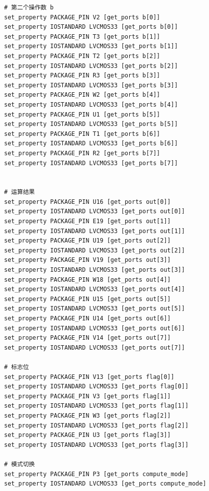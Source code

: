 \documentclass{SYSUReport}
\begin{document}
\begin{enumerate}[label={\chinese*、},labelsep=0pt]
\begin{enumerate}[label = \arabic*、]
\begin{verbatim}
        # 第二个操作数 b
        set_property PACKAGE_PIN V2 [get_ports b[0]]
        set_property IOSTANDARD LVCMOS33 [get_ports b[0]]
        set_property PACKAGE_PIN T3 [get_ports b[1]]
        set_property IOSTANDARD LVCMOS33 [get_ports b[1]]
        set_property PACKAGE_PIN T2 [get_ports b[2]]
        set_property IOSTANDARD LVCMOS33 [get_ports b[2]]
        set_property PACKAGE_PIN R3 [get_ports b[3]]
        set_property IOSTANDARD LVCMOS33 [get_ports b[3]]
        set_property PACKAGE_PIN W2 [get_ports b[4]]
        set_property IOSTANDARD LVCMOS33 [get_ports b[4]]
        set_property PACKAGE_PIN U1 [get_ports b[5]]
        set_property IOSTANDARD LVCMOS33 [get_ports b[5]]
        set_property PACKAGE_PIN T1 [get_ports b[6]]
        set_property IOSTANDARD LVCMOS33 [get_ports b[6]]
        set_property PACKAGE_PIN R2 [get_ports b[7]]
        set_property IOSTANDARD LVCMOS33 [get_ports b[7]]


        # 运算结果
        set_property PACKAGE_PIN U16 [get_ports out[0]]
        set_property IOSTANDARD LVCMOS33 [get_ports out[0]]
        set_property PACKAGE_PIN E19 [get_ports out[1]]
        set_property IOSTANDARD LVCMOS33 [get_ports out[1]]
        set_property PACKAGE_PIN U19 [get_ports out[2]]
        set_property IOSTANDARD LVCMOS33 [get_ports out[2]]
        set_property PACKAGE_PIN V19 [get_ports out[3]]
        set_property IOSTANDARD LVCMOS33 [get_ports out[3]]
        set_property PACKAGE_PIN W18 [get_ports out[4]]
        set_property IOSTANDARD LVCMOS33 [get_ports out[4]]
        set_property PACKAGE_PIN U15 [get_ports out[5]]
        set_property IOSTANDARD LVCMOS33 [get_ports out[5]]
        set_property PACKAGE_PIN U14 [get_ports out[6]]
        set_property IOSTANDARD LVCMOS33 [get_ports out[6]]
        set_property PACKAGE_PIN V14 [get_ports out[7]]
        set_property IOSTANDARD LVCMOS33 [get_ports out[7]]

        # 标志位
        set_property PACKAGE_PIN V13 [get_ports flag[0]]
        set_property IOSTANDARD LVCMOS33 [get_ports flag[0]]
        set_property PACKAGE_PIN V3 [get_ports flag[1]]
        set_property IOSTANDARD LVCMOS33 [get_ports flag[1]]
        set_property PACKAGE_PIN W3 [get_ports flag[2]]
        set_property IOSTANDARD LVCMOS33 [get_ports flag[2]]
        set_property PACKAGE_PIN U3 [get_ports flag[3]]
        set_property IOSTANDARD LVCMOS33 [get_ports flag[3]]

        # 模式切换
        set_property PACKAGE_PIN P3 [get_ports compute_mode]
        set_property IOSTANDARD LVCMOS33 [get_ports compute_mode]



\end{verbatim}
\end{enumerate}
\end{enumerate}
\end{document}

